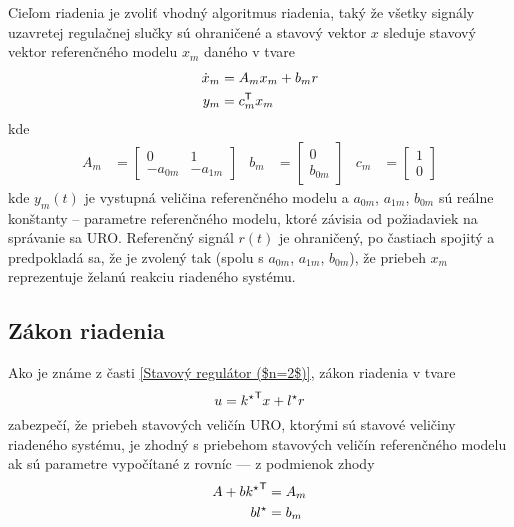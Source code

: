 \documentclass[a4paper, 10pt, ]{article}
\begin{document}
Cieľom riadenia je zvoliť vhodný algoritmus riadenia, taký že všetky signály uzavretej regulačnej slučky sú ohraničené a stavový vektor $x$ sleduje stavový vektor referenčného modelu $x_m$ daného v tvare
\begin{subequations}
    \begin{align}
        \dot x_m &= A_m x_m + b_m r \\
        y_m &= c_m^{\mathsf{T}} x_m
        \end{align}
\end{subequations}
kde
\begin{align*}
    A_m &= \begin{bmatrix} 0 & 1 \\ -a_{0m} & -a_{1m} \end{bmatrix}
    &
    b_m &= \begin{bmatrix} 0 \\ b_{0m} \end{bmatrix}
    &
    c_m &= \begin{bmatrix} 1 \\ 0 \end{bmatrix}
\end{align*}
kde $y_m(t)$ je vystupná veličina referenčného modelu a $a_{0m}$, $a_{1m}$, $b_{0m}$ sú reálne konštanty -- parametre referenčného modelu, ktoré závisia od požiadaviek na správanie sa URO. Referenčný signál $r(t)$ je ohraničený, po častiach spojitý a predpokladá sa, že je zvolený tak (spolu s $a_{0m}$, $a_{1m}$, $b_{0m}$), že priebeh $x_m$ reprezentuje želanú reakciu riadeného systému.





\subsection{Zákon riadenia}

Ako je známe z časti \ref{Stavový regulátor ($n=2$)}, zákon riadenia v tvare
\begin{equation} \label{idealZakRiadenia2r}
    u = {k^\star}^{\mathsf{T}} x + l^\star r
\end{equation}
zabezpečí, že priebeh stavových veličín URO, ktorými sú stavové veličiny riadeného systému, je zhodný s priebehom stavových veličín referenčného modelu ak sú parametre vypočítané z rovníc --- z podmienok zhody
\begin{subequations} \label{podmienkyZhody2r02}
    \begin{align}
        A + b {k^\star}^{\mathsf{T}} & = A_m \\
        b l^\star &= b_m
    \end{align}
\end{subequations}
\end{document}
